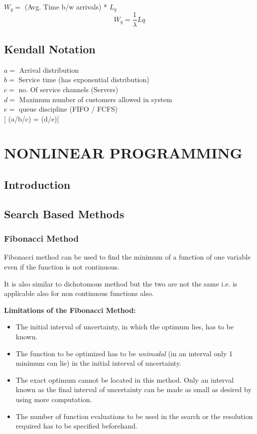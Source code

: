 \documentclass[12pt, letterpaper]{article}
\begin{document}
$W_q =$ (Avg. Time b/w arrivals) * $L_q$  $$ W_q = \frac{1}{\lambda}Lq $$

\subsection{Kendall Notation}
$a =$ Arrival distribution \\
$b =$ Service time (has exponential distribution) \\
$c =$ no. Of service channels (Servers) \\
$d =$ Maximum number of customers allowed in system \\
$e =$ queue discipline (FIFO / FCFS) \\

[ (a/b/c) = (d/e)]
\section{NONLINEAR PROGRAMMING} 
\subsection{Introduction}

\subsection{Search Based Methods}
\subsubsection{Fibonacci Method}
Fibonacci method can be used to find the minimum of a function of one variable even if the function is not continuous.

It is also similar to dichotomous method but the two are not the same i.e. is applicable also for  non continuous functions also.

\begin{center}
    \textbf{Limitations of the Fibonacci Method: }
\end{center}
\begin{itemize}
    \item The initial interval of uncertainty, in which the optimum lies, has to be known.
    \item The function to be optimized has to be \emph{unimodal} (in an interval only 1 minimum can lie) in the initial interval of uncertainty.
    \item The exact optimum cannot be located in this method. Only an interval known as the final interval of uncertainty can be made as small as desired by using more computation.
    \item The number of function evaluations to be used in the search or the resolution required has to be specified beforehand.
\end{itemize}
\end{document}
